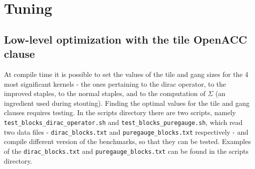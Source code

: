 \section{Tuning}
\label{tuning}

\subsection{Low-level optimization with the {\sf tile} OpenACC clause}

At compile time it is possible to set the values of the {\sf tile } and {\sf gang} sizes 
for the 4 most significant kernels - the ones pertaining to the 
dirac operator, to the improved staples, to the normal staples, and to the computation of
$\Sigma$ (an ingredient used during stouting).
Finding the optimal values for the {\sf tile} and {\sf gang} clauses requires testing. 
In the {\sf scripts} directory there are two scripts, namely 
\verb|test_blocks_dirac_operator.sh| and 
\verb|test_blocks_puregauge.sh|, which read two data files - 
\verb|dirac_blocks.txt| and 
\verb|puregauge_blocks.txt| respectively - and compile different version of the benchmarks, 
so that they can be tested. Examples of the \verb|dirac_blocks.txt| and 
\verb|puregauge_blocks.txt| can be found in the {\sf scripts} directory. 


